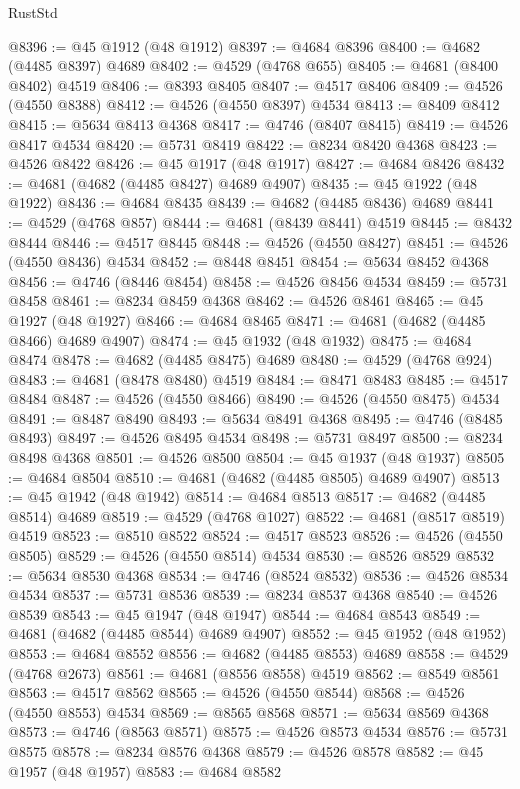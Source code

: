 \begin{lexlean}{RustStd}
\begin{coremodule}
@8396 := @45 @1912 (@48 @1912)
@8397 := @4684 @8396
@8400 := @4682 (@4485 @8397) @4689
@8402 := @4529 (@4768 @655)
@8405 := @4681 (@8400 @8402) @4519
@8406 := @8393 @8405
@8407 := @4517 @8406
@8409 := @4526 (@4550 @8388)
@8412 := @4526 (@4550 @8397) @4534
@8413 := @8409 @8412
@8415 := @5634 @8413 @4368
@8417 := @4746 (@8407 @8415)
@8419 := @4526 @8417 @4534
@8420 := @5731 @8419
@8422 := @8234 @8420 @4368
@8423 := @4526 @8422
@8426 := @45 @1917 (@48 @1917)
@8427 := @4684 @8426
@8432 := @4681 (@4682 (@4485 @8427) @4689 @4907)
@8435 := @45 @1922 (@48 @1922)
@8436 := @4684 @8435
@8439 := @4682 (@4485 @8436) @4689
@8441 := @4529 (@4768 @857)
@8444 := @4681 (@8439 @8441) @4519
@8445 := @8432 @8444
@8446 := @4517 @8445
@8448 := @4526 (@4550 @8427)
@8451 := @4526 (@4550 @8436) @4534
@8452 := @8448 @8451
@8454 := @5634 @8452 @4368
@8456 := @4746 (@8446 @8454)
@8458 := @4526 @8456 @4534
@8459 := @5731 @8458
@8461 := @8234 @8459 @4368
@8462 := @4526 @8461
@8465 := @45 @1927 (@48 @1927)
@8466 := @4684 @8465
@8471 := @4681 (@4682 (@4485 @8466) @4689 @4907)
@8474 := @45 @1932 (@48 @1932)
@8475 := @4684 @8474
@8478 := @4682 (@4485 @8475) @4689
@8480 := @4529 (@4768 @924)
@8483 := @4681 (@8478 @8480) @4519
@8484 := @8471 @8483
@8485 := @4517 @8484
@8487 := @4526 (@4550 @8466)
@8490 := @4526 (@4550 @8475) @4534
@8491 := @8487 @8490
@8493 := @5634 @8491 @4368
@8495 := @4746 (@8485 @8493)
@8497 := @4526 @8495 @4534
@8498 := @5731 @8497
@8500 := @8234 @8498 @4368
@8501 := @4526 @8500
@8504 := @45 @1937 (@48 @1937)
@8505 := @4684 @8504
@8510 := @4681 (@4682 (@4485 @8505) @4689 @4907)
@8513 := @45 @1942 (@48 @1942)
@8514 := @4684 @8513
@8517 := @4682 (@4485 @8514) @4689
@8519 := @4529 (@4768 @1027)
@8522 := @4681 (@8517 @8519) @4519
@8523 := @8510 @8522
@8524 := @4517 @8523
@8526 := @4526 (@4550 @8505)
@8529 := @4526 (@4550 @8514) @4534
@8530 := @8526 @8529
@8532 := @5634 @8530 @4368
@8534 := @4746 (@8524 @8532)
@8536 := @4526 @8534 @4534
@8537 := @5731 @8536
@8539 := @8234 @8537 @4368
@8540 := @4526 @8539
@8543 := @45 @1947 (@48 @1947)
@8544 := @4684 @8543
@8549 := @4681 (@4682 (@4485 @8544) @4689 @4907)
@8552 := @45 @1952 (@48 @1952)
@8553 := @4684 @8552
@8556 := @4682 (@4485 @8553) @4689
@8558 := @4529 (@4768 @2673)
@8561 := @4681 (@8556 @8558) @4519
@8562 := @8549 @8561
@8563 := @4517 @8562
@8565 := @4526 (@4550 @8544)
@8568 := @4526 (@4550 @8553) @4534
@8569 := @8565 @8568
@8571 := @5634 @8569 @4368
@8573 := @4746 (@8563 @8571)
@8575 := @4526 @8573 @4534
@8576 := @5731 @8575
@8578 := @8234 @8576 @4368
@8579 := @4526 @8578
@8582 := @45 @1957 (@48 @1957)
@8583 := @4684 @8582

\end{coremodule}
\end{lexlean}
